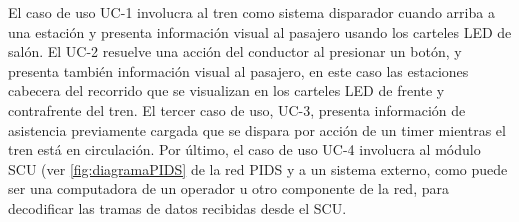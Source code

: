 El caso de uso UC-1 involucra al tren como sistema disparador cuando arriba a una estación y presenta información visual al pasajero usando los carteles LED de salón. El UC-2 resuelve una acción del conductor al presionar un botón, y presenta también información visual al pasajero, en este caso las estaciones cabecera del recorrido que se visualizan en los carteles LED de frente y contrafrente del tren. El tercer caso de uso, UC-3, presenta información de asistencia previamente cargada que se dispara por acción de un timer mientras el tren está en circulación. Por último, el caso de uso UC-4 involucra al módulo SCU (ver \ref{fig:diagramaPIDS} de la red PIDS y a un sistema externo, como puede ser una computadora de un operador u otro componente de la red, para decodificar las tramas de datos recibidas desde el SCU.\\



